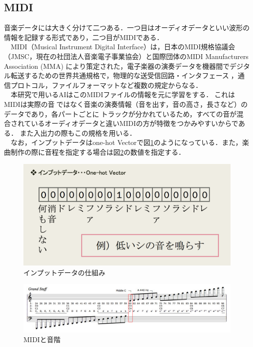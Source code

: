 \subsection{MIDI}
音楽データには大きく分けて二つある．一つ目はオーディオデータといい波形の情報を記録する形式であり，二つ目がMIDIである．\\
　MIDI（Musical Instrument Digital Interface）は，日本のMIDI規格協議会（JMSC，現在の社団法人音楽電子事業協会）と国際団体のMIDI Manufacturers Association (MMA) により策定された，電子楽器の演奏データを機器間でデジタル転送するための世界共通規格で，物理的な送受信回路・インタフェース，通信プロトコル，ファイルフォーマットなど複数の規定からなる．\\
　本研究で用いるAIはこのMIDIファイルの情報を元に学習をする．これはMIDIは実際の音ではなく音楽の演奏情報（音を出す，音の高さ，長さなど）のデータであり，各パートごとにトラックが分かれているため，すべての音が混合されているオーディオデータと違いMIDIの方が特徴をつかみやすいからである．
また入出力の際もこの規格を用いる．\\
　なお，インプットデータはone-hot Vectorで図\ref{fig:インプットデータの仕組み}のようになっている．また，楽曲制作の際に音程を指定する場合は図\ref{fig:MIDIと音階}の数値を指定する．
\begin{figure}[h]
    \begin{screen}
    \begin{center}
        \includegraphics[scale=0.85,clip]{./img/midi1.png}
        \caption{インプットデータの仕組み}
        \label{fig:インプットデータの仕組み}
    \end{center}
    \end{screen}
\end{figure}
\newpage
\begin{figure}[h]
    \begin{screen}
    \begin{center}
        \includegraphics[scale=0.45,clip]{./img/midi2.png}
        \caption{MIDIと音階}
        \label{fig:MIDIと音階}
    \end{center}
    \end{screen}
\end{figure}
\newpage
